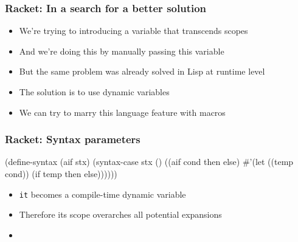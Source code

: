 \documentclass[hyperref={bookmarks=false}]{beamer}
\begin{document}
\begin{frame}[fragile]
\frametitle{Racket: In a search for a better solution}
\begin{itemize}
\item We're trying to introducing a variable that transcends scopes
\item And we're doing this by manually passing this variable
\item But the same problem was already solved in Lisp at runtime level
\item The solution is to use dynamic variables
\item We can try to marry this language feature with macros
\end{itemize}
\end{frame}

\begin{frame}[fragile]
\frametitle{Racket: Syntax parameters}
\begin{semiverbatim}

\text{\color{teal}{(define-syntax-parameter it (syntax-rules ()))}}

(define-syntax (aif stx)
  (syntax-case stx ()
    ((aif cond then else)
     #'(let ((temp cond))
             \text{\color{teal}{(syntax-parameterize}}
               \text{\color{teal}{((it (syntax-rules () ((_) temp))))}}
         (if temp then else))))))

\end{semiverbatim}

\begin{itemize}
\item \texttt{it} becomes a compile-time dynamic variable
\item Therefore its scope overarches all potential expansions
\item \text{\color{blue}{High-level language feature (dynamic variables) + macros = win}}
\end{itemize}
\end{frame}
\end{document}
